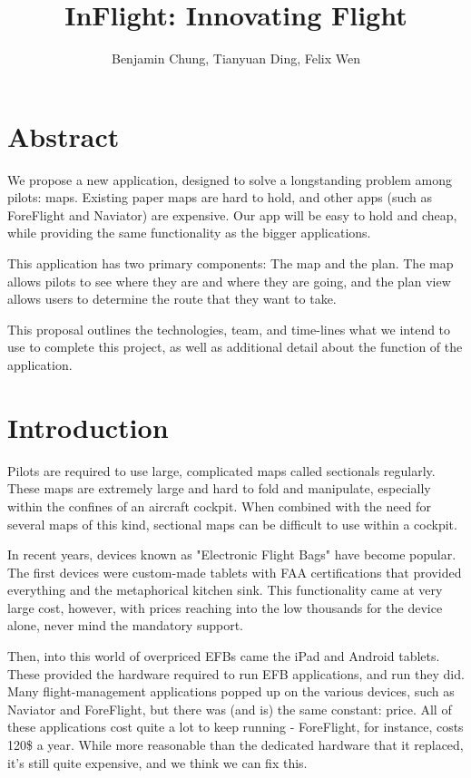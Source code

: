 \documentclass[10pt,a4paper]{article}
\author{Benjamin Chung, Tianyuan Ding, Felix Wen}
\title{InFlight: Innovating Flight}
\begin{document}
\maketitle
\section*{Abstract}
We propose a new application, designed to solve a longstanding problem among pilots: maps. Existing paper maps are hard to hold, and other apps (such as ForeFlight and Naviator) are expensive. Our app will be easy to hold and cheap, while providing the same functionality as the bigger applications.

This application has two primary components: The map and the plan. The map allows pilots to see where they are and where they are going, and the plan view allows users to determine the route that they want to take.

This proposal outlines the technologies, team, and time-lines what we intend to use to complete this project, as well as additional detail about the function of the application.
\tableofcontents

\section{Introduction}
Pilots are required to use large, complicated maps called sectionals regularly. These maps are extremely large and hard to fold and manipulate, especially within the confines of an aircraft cockpit. When combined with the need for several maps of this kind, sectional maps can be difficult to use within a cockpit.

In recent years, devices known as "Electronic Flight Bags" have become popular. The first devices were custom-made tablets with FAA certifications that provided everything and the metaphorical kitchen sink. This functionality came at very large cost, however, with prices reaching into the low thousands for the device alone, never mind the mandatory support.

Then, into this world of overpriced EFBs came the iPad and Android tablets. These provided the hardware required to run EFB applications, and run they did. Many flight-management applications popped up on the various devices, such as Naviator and ForeFlight, but there was (and is) the same constant: price. All of these applications cost quite a lot to keep running - ForeFlight, for instance, costs 120\$ a year. While more reasonable than the dedicated hardware that it replaced, it's still quite expensive, and we think we can fix this.
\end{document}
